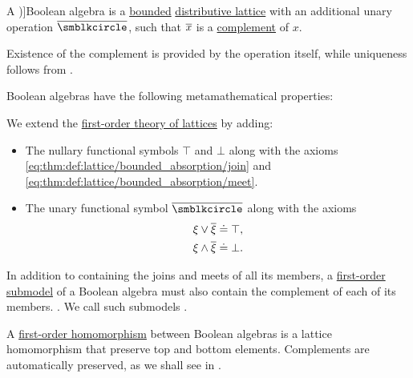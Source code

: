 \begin{definition}\label{def:boolean_algebra}
  A \term[ru=булева алгебра (\cite[def. 1.1]{Гуров2013})]{Boolean algebra} is a \hyperref[def:extremal_points/bounds]{bounded} \hyperref[def:distributive_lattice]{distributive lattice} with an additional unary operation \( {\oline \anon} \), such that \( {\oline x} \) is a \hyperref[def:bounded_lattice_complement]{complement} of \( x \).

  Existence of the complement is provided by the operation itself, while uniqueness follows from .

  Boolean algebras have the following metamathematical properties:
  \begin{thmenum}[resume=def:boolean_algebra]
     We extend the \hyperref[def:lattice/theory]{first-order theory of lattices} by adding:
    \begin{itemize}
      \item The nullary functional symbols \( \top \) and \( \bot \) along with the axioms \eqref{eq:thm:def:lattice/bounded_absorption/join} and \eqref{eq:thm:def:lattice/bounded_absorption/meet}.

      \item The unary functional symbol \( {\oline {\anon}} \) along with the axioms
      \begin{subequations}
        \begin{align}
          \xi \vee \oline \xi \syneq \top, \label{eq:def:boolean_algebra/join} \\
          \xi \wedge \oline \xi \syneq \bot. \label{eq:def:boolean_algebra/meet}
        \end{align}
      \end{subequations}
    \end{itemize}

     In addition to containing the joins and meets of all its members, a \hyperref[def:first_order_submodel]{first-order submodel} of a Boolean algebra must also contain the complement of each of its members. . We call such submodels .

     A \hyperref[def:first_order_homomorphism]{first-order homomorphism} between Boolean algebras is a lattice homomorphism that preserve top and bottom elements. Complements are automatically preserved, as we shall see in .


\end{thmenum}
\end{definition}
